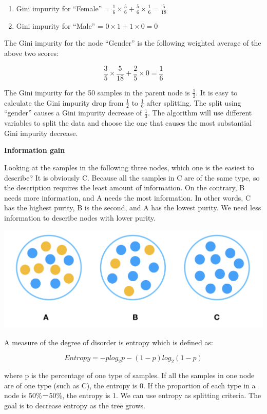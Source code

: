 \documentclass[12pt,]{krantz}
\providecommand{\tightlist}{%
  \setlength{\itemsep}{0pt}\setlength{\parskip}{0pt}}
\begin{document}
\begin{enumerate}
\def\labelenumi{\arabic{enumi}.}
\tightlist
\item
  Gini impurity for ``Female'' = \(\frac{1}{6}\times\frac{5}{6}+\frac{5}{6}\times\frac{1}{6}=\frac{5}{18}\)
\item
  Gini impurity for ``Male'' = \(0\times1+1\times 0=0\)
\end{enumerate}

The Gini impurity for the node ``Gender'' is the following weighted average of the above two scores:

\[\frac{3}{5}\times\frac{5}{18}+\frac{2}{5}\times 0=\frac{1}{6}\]

The Gini impurity for the 50 samples in the parent node is \(\frac{1}{2}\). It is easy to calculate the Gini impurity drop from \(\frac{1}{2}\) to \(\frac{1}{6}\) after splitting. The split using ``gender'' causes a Gini impurity decrease of \(\frac{1}{3}\). The algorithm will use different variables to split the data and choose the one that causes the most substantial Gini impurity decrease.

\textbf{Information gain}

Looking at the samples in the following three nodes, which one is the easiest to describe? It is obviously C. Because all the samples in C are of the same type, so the description requires the least amount of information. On the contrary, B needs more information, and A needs the most information. In other words, C has the highest purity, B is the second, and A has the lowest purity. We need less information to describe nodes with lower purity.

\includegraphics{images/InfoGainEN.PNG}

A measure of the degree of disorder is entropy which is defined as:

\[Entropy=-plog_{2}p-(1-p)log_{2}(1-p)\]

where p is the percentage of one type of samples. If all the samples in one node are of one type (such as C), the entropy is 0. If the proportion of each type in a node is 50\%－50\%, the entropy is 1. We can use entropy as splitting criteria. The goal is to decrease entropy as the tree grows.
\end{document}
